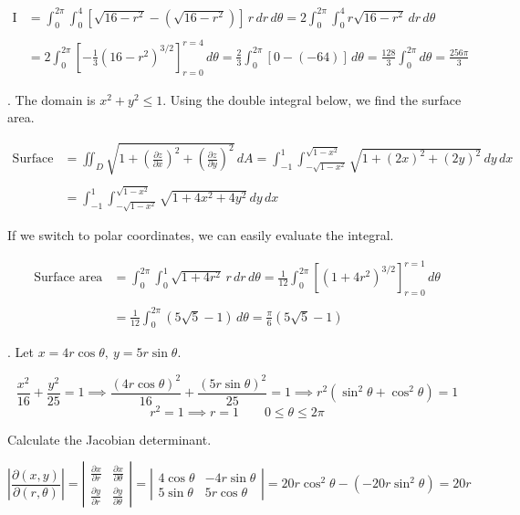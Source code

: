\documentclass{article}
\begin{document}
\begin{align*}\mathrm{I}&=\int_0^{2\pi}\int_0^4\left[\sqrt{16-r^2}-\left(\sqrt{16-r^2}\right)\right]\,r\,dr\,d\theta=2\int_0^{2\pi}\int_0^4r\sqrt{16-r^2}\,dr\,d\theta\\\\&=2\int_0^{2\pi}\left[-\frac13\left(16-r^2\right)^{3/2}\right]_{r=0}^{r=4}\,d\theta=\frac23\int_0^{2\pi}\left[0-\left(-64\right)\right]\,d\theta=\frac{128}3\int_0^{2\pi}d\theta=\boxed{\frac{256\pi}3}\end{align*}

\hfill

. The domain is $x^2+y^2\leq1$. Using the double integral below, we find the surface area.

\begin{align*}
\text{Surface area}&=\iint_D\sqrt{1+\left(\frac{\partial z}{\partial x}\right)^2 +\left(\frac{\partial z}{\partial y}\right)^2}\,dA=\int_{-1}^1\int_{-\sqrt{1-x^2}}^{\sqrt{1-x^2}}\sqrt{1+\left(2x\right)^2 +\left(2y\right)^2}\,dy\,dx\\\\&=\int_{-1}^1\int_{-\sqrt{1-x^2}}^{\sqrt{1-x^2}}\sqrt{1+4x^2+4y^2}\,dy\,dx
\end{align*}

\hfill

\noindent If we switch to polar coordinates, we can easily evaluate the integral.

\begin{align*}\text{Surface area}&=\int_0^{2\pi}\int_0^1\sqrt{1+4r^2}\,r\,dr\,d\theta=\frac1{12}\int_0^{2\pi}\left[\left(1+4r^2\right)^{3/2}\right]_{r=0}^{r=1}\,d\theta\\\\&=\frac1{12}\int_0^{2\pi}\left(5\sqrt5-1\right)\,d\theta=\boxed{\frac\pi6\left(5\sqrt5-1\right)}\end{align*}

\hfill

. Let $x=4r\cos\theta,\:y=5r\sin\theta$.

\[\frac{x^2}{16}+\frac{y^2}{25}=1\implies\frac{(4r\cos\theta)^2}{16}+\frac{(5r\sin\theta)^2}{25}=1\implies r^2\left(\sin^2\theta+\cos^2\theta\right)=1\]
\[r^2=1\implies r=1\quad\quad0\leq\theta\leq2\pi\]

\newpage

\noindent Calculate the Jacobian determinant.

\[
\left|\frac{\partial(x,y)}{\partial(r,\theta)}\right|=\left|\begin{array}{cc}
\displaystyle\frac{\partial x}{\partial r}&\displaystyle\frac{\partial x}{\partial\theta}\\[1em]
\displaystyle\frac{\partial y}{\partial r}&\displaystyle\frac{\partial y}{\partial\theta}
\end{array}\right|=\left|\begin{array}{cc}
4\cos\theta&-4r\sin\theta\\
5\sin\theta&5r\cos\theta
\end{array}\right|=20r\cos^2\theta-\left(-20r\sin^2\theta\right)=20r
\]
\end{document}
